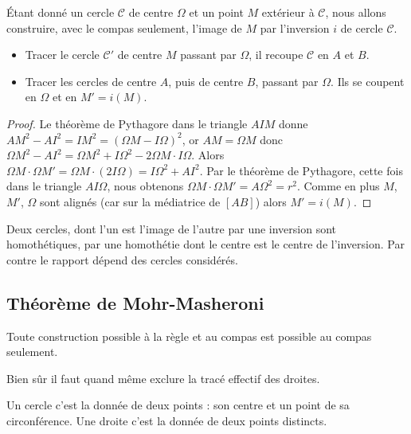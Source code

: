 \documentclass[11pt,class=report,crop=false]{standalone}
\newcommand{\inversion}{i}
\begin{document}
\'Etant donné un cercle $\mathcal{C}$ de centre $\Omega$ et un point $M$
extérieur à $\mathcal{C}$, nous allons construire, avec le compas seulement, 
l'image de $M$ par l'inversion $\inversion$ de cercle $\mathcal{C}$.
\begin{itemize}
  \item Tracer le cercle $\mathcal{C}'$ de centre $M$ passant par $\Omega$,
  il recoupe $\mathcal{C}$ en $A$ et $B$.
  
  \item Tracer les cercles de centre $A$, puis de centre $B$, passant par 
  $\Omega$. Ils se coupent en $\Omega$ et en $M' = \inversion(M)$.
\end{itemize}


\begin{proof}
Le théorème de Pythagore dans le triangle $AIM$ donne
$AM ^2 - AI^2 = IM^2 = (\Omega M - I \Omega)^2$, or $AM=\Omega M$
donc $\Omega M^2 - AI^2 = \Omega M^2 + I\Omega^2 - 2 \Omega M \cdot I\Omega$.
Alors $\Omega M \cdot \Omega M' = \Omega M \cdot(2I\Omega) = I\Omega^2 + AI^2$.
Par le théorème de Pythagore, cette fois dans le triangle $AI\Omega$,
nous obtenons $\Omega M \cdot \Omega M' = A\Omega ^2 = r^2$. 
Comme en plus $M$, $M'$, $\Omega$ sont alignés (car sur la médiatrice de $[AB]$) alors
$M' = \inversion(M)$.
\end{proof}


\begin{remarque*}
Deux cercles, dont l'un est l'image de l'autre par une inversion sont homothétiques,
par une homothétie dont le centre est le centre de l'inversion. Par contre le rapport
dépend des cercles considérés.
\end{remarque*}


\subsection{Théorème de Mohr-Masheroni}

\begin{theoreme}
Toute construction possible à la règle et au compas
est possible au compas seulement.
\end{theoreme}

Bien sûr il faut quand même exclure la tracé effectif des droites.

Un cercle c'est la donnée de deux points : son centre et un point de sa circonférence.
Une droite c'est la donnée de deux points distincts.
\end{document}
